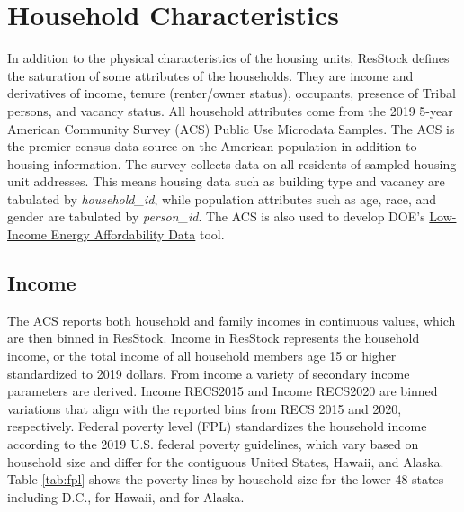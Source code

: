 \section{Household Characteristics}

In addition to the physical characteristics of the housing units, ResStock defines the saturation of some attributes of the households. They are income and derivatives of income, tenure (renter/owner status), occupants, presence of Tribal persons, and vacancy status. All household attributes come from the 2019 5-year American Community Survey (ACS) Public Use Microdata Samples. The ACS is the premier census data source on the American population in addition to housing information. The survey collects data on all residents of sampled housing unit addresses. This means housing data such as building type and vacancy are tabulated by \textit{household\_id}, while population attributes such as age, race, and gender are tabulated by \textit{person\_id}. The ACS is also used to develop DOE’s \href{https://www.energy.gov/scep/slsc/lead-tool}{Low-Income Energy Affordability Data} tool.

\subsection{Income}
The ACS reports both household and family incomes in continuous values, which are then binned in ResStock. Income in ResStock represents the household income, or the total income of all household members age 15 or higher standardized to 2019 dollars. From income a variety of secondary income parameters are derived. Income RECS2015 and Income RECS2020 are binned variations that align with the reported bins from RECS 2015 and 2020, respectively. Federal poverty level (FPL) standardizes the household income according to the 2019 U.S. federal poverty guidelines, which vary based on household size and differ for the contiguous United States, Hawaii, and Alaska. Table \ref{tab:fpl} shows the poverty lines by household size for the lower 48 states including D.C., for Hawaii, and for Alaska.


